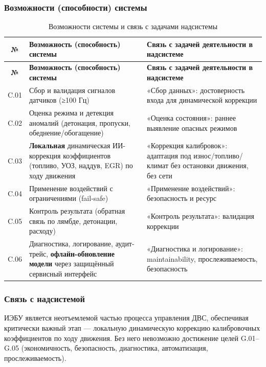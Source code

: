 \documentclass[14pt, a4paper]{extarticle}
\begin{document}
		
		\subsubsection{Возможности (способности) системы}
		\noindent
		\begin{xltabular}{\textwidth}{|c|L|L|}
			\caption{Возможности системы и связь с задачами надсистемы}\label{tab:capabilities1}\\
			\hline
			\textbf{№} & \textbf{Возможность (способность) системы} & \textbf{Связь с задачей деятельности в надсистеме} \\
			\hline
			\endfirsthead
			\hline
			\textbf{№} & \textbf{Возможность (способность) системы} & \textbf{Связь с задачей деятельности в надсистеме} \\
			\hline
			\endhead
			\hline
			\endfoot
			\hline
			\endlastfoot
			C.01 & Сбор и валидация сигналов датчиков (≥100 Гц) & «Сбор данных»: достоверность входа для динамической коррекции \\
			\hline
			C.02 & Оценка режима и детекция аномалий (детонация, пропуски, обеднение/обогащение) & «Оценка состояния»: раннее выявление опасных режимов \\
			\hline
			C.03 & \textbf{Локальная} динамическая ИИ-коррекция коэффициентов (топливо, УОЗ, наддув, EGR) по ходу движения & «Коррекция калибровок»: адаптация под износ/топливо/климат без остановки движения, без сети \\
			\hline
			C.04 & Применение воздействий с ограничениями (fail-safe) & «Применение воздействий»: безопасность и ресурс \\
			\hline
			C.05 & Контроль результата (обратная связь по лямбде, детонации, расходу) & «Контроль результата»: валидация коррекции \\
			\hline
			C.06 & Диагностика, логирование, аудит-трейс, \textbf{офлайн-обновление модели} через защищённый сервисный интерфейс & «Диагностика и логирование»: maintainability, прослеживаемость, безопасность \\
			\hline
		\end{xltabular}
		\vspace{\parindent}
		
		\subsubsection{Связь с надсистемой}
		
		ИЭБУ является неотъемлемой частью процесса управления ДВС, обеспечивая критически важный этап — локальную динамическую коррекцию калибровочных коэффициентов по ходу движения. Без него невозможно достижение целей G.01–G.05 (экономичность, безопасность, диагностика, автоматизация, прослеживаемость).
		
\end{document}
